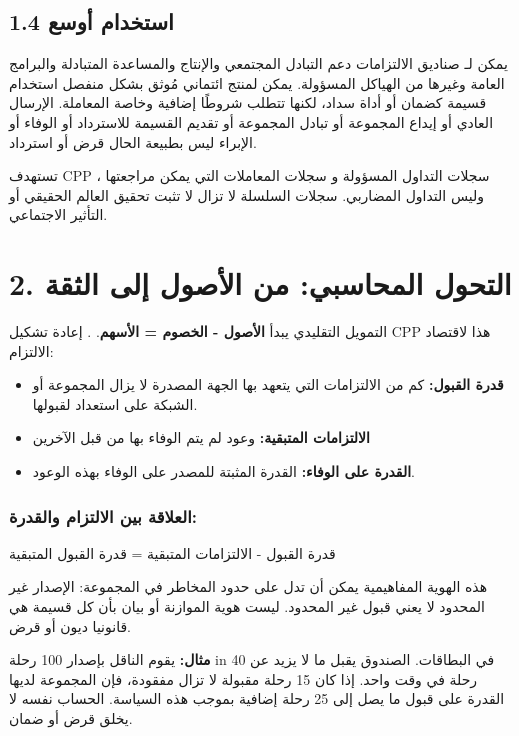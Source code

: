 \documentclass[11pt]{article}
\begin{document}
\subsection*{1.4 استخدام أوسع}

يمكن لـ صناديق الالتزامات دعم التبادل المجتمعي والإنتاج والمساعدة المتبادلة والبرامج العامة وغيرها من الهياكل المسؤولة. يمكن لمنتج ائتماني مُوثق بشكل منفصل استخدام قسيمة كضمان أو أداة سداد، لكنها تتطلب شروطًا إضافية وخاصة المعاملة. الإرسال العادي أو إيداع المجموعة أو تبادل المجموعة أو تقديم القسيمة للاسترداد أو الوفاء أو الإبراء ليس بطبيعة الحال قرض أو استرداد.

تستهدف CPP سجلات التداول المسؤولة و سجلات المعاملات التي يمكن مراجعتها ، وليس التداول المضاربي. سجلات السلسلة لا تزال لا تثبت تحقيق العالم الحقيقي أو التأثير الاجتماعي.


\section*{2. التحول المحاسبي: من الأصول إلى الثقة}

التمويل التقليدي يبدأ \textbf{الأصول - الخصوم = الأسهم}. . إعادة تشكيل CPP هذا لاقتصاد الالتزام:

\begin{itemize}[leftmargin=*]
\item \textbf{قدرة القبول:} كم من الالتزامات التي يتعهد بها الجهة المصدرة لا يزال المجموعة أو الشبكة على استعداد لقبولها.
\item \textbf{الالتزامات المتبقية:} وعود لم يتم الوفاء بها من قبل الآخرين
\item \textbf{القدرة على الوفاء:} القدرة المثبتة للمصدر على الوفاء بهذه الوعود.
\end{itemize}
\subsubsection*{العلاقة بين الالتزام والقدرة:}

قدرة القبول - الالتزامات المتبقية = قدرة القبول المتبقية

هذه الهوية المفاهيمية يمكن أن تدل على حدود المخاطر في المجموعة: الإصدار غير المحدود لا يعني قبول غير المحدود. ليست هوية الموازنة أو بيان بأن كل قسيمة هي قانونيا ديون أو قرض.

\textbf{مثال:} يقوم الناقل بإصدار 100 رحلة in في البطاقات. الصندوق يقبل ما لا يزيد عن 40 رحلة في وقت واحد. إذا كان 15 رحلة مقبولة لا تزال مفقودة، فإن المجموعة لديها القدرة على قبول ما يصل إلى 25 رحلة إضافية بموجب هذه السياسة. الحساب نفسه لا يخلق قرض أو ضمان.
\end{document}
